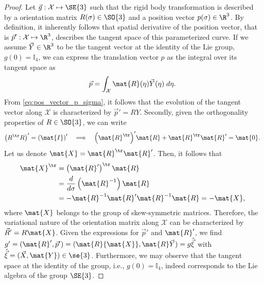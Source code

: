 \begin{proof}
Let $\vec{g}: \mathcal{X} \mapsto \SE{3}$ such that the rigid body transformation is described by a orientation matrix $R(\sigma) \in \SO{3}$ and a position vector $p(\sigma) \in \R^3$. By definition, it inherently follows that spatial derivative of the position vector, that is $\vec{p}': \mathcal{X} \mapsto \R^3$, describes the tangent space of this parameterized curve. If we assume $\vec{Y} \in \R^3$ to be the tangent vector at the identity of the Lie group, $g(0) = \mathbb{I}_4$, we can express the translation vector $p$ as the integral over its tangent space as
\begin{equation}
\vec{p} = \int_\mathcal{X} \mat{R}(\eta) \vec{Y}(\eta) \; d\eta. \label{eq:pos_vector_p_sigma}
\end{equation}
From \eqref{eq:pos_vector_p_sigma}, it follows that the evolution of the tangent vector along $\mathcal{X}$ is characterized by $\vec{p}' = R Y$. Secondly, given the orthogonality properties of $R \in \SO{3}$, we can write
\begin{align}
\left( R^\tr R \right)' = \left( \mat{I} \right)' \quad \Longrightarrow \quad \left(\mat{R}^\tr \right)'\!\mat{R} + \mat{R}^\tr \mat{R}' = \mat{0}.
\end{align}
Let us denote ${\mat{X}} = \mat{R}^\tr \mat{R}'$. Then, it follows that 
\begin{align}
 \mat{X}^\tr & = \left(\mat{R}'\right)^\tr \mat{R} \notag \\ 
& = \frac{d}{d\sigma}\left(\mat{R}^{-1} \right) \mat{R} \notag \\ 
& = -\mat{R}^{-1} \mat{R}' \mat{R}^{-1} \mat{R} = -\mat{X},
\end{align}
where ${\mat{X}}$ belongs to the group of skew-symmetric matrices. Therefore, the variational nature of the orientation matrix along $\mathcal{X}$ can be characterized by $\vec{R}' = R \mat{X}$. Given the expressions for $\vec{p}'$ and $\mat{R}'$, we find $g' = (\mat{R}',\vec{p}') = (\mat{R}{\mat{X}},\mat{R}\vec{Y}) = g\hat{\vec{\xi}}$ with $\hat{\vec{\xi}} = (\vec{X},{\mat{Y}}) \in \se{3}$. Furthermore, we may observe that the tangent space at the identity of the group, i.e., $g(0) = \mathbb{I}_4$, indeed corresponds to the Lie algebra of the group $\SE{3}$.
\end{proof}

